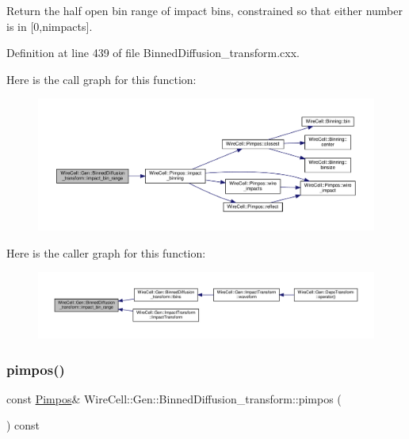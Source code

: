 Return the half open bin range of impact bins, constrained so that either number is in \mbox{[}0,nimpacts\mbox{]}. 

Definition at line 439 of file Binned\+Diffusion\+\_\+transform.\+cxx.

Here is the call graph for this function\+:
\nopagebreak
\begin{figure}[H]
\begin{center}
\leavevmode
\includegraphics[width=350pt]{class_wire_cell_1_1_gen_1_1_binned_diffusion__transform_acc55b5ad48ce4bc6081155bc9b3847aa_cgraph}
\end{center}
\end{figure}
Here is the caller graph for this function\+:
\nopagebreak
\begin{figure}[H]
\begin{center}
\leavevmode
\includegraphics[width=350pt]{class_wire_cell_1_1_gen_1_1_binned_diffusion__transform_acc55b5ad48ce4bc6081155bc9b3847aa_icgraph}
\end{center}
\end{figure}
\mbox{\label{class_wire_cell_1_1_gen_1_1_binned_diffusion__transform_a5da47771953721da39a78625d1845363}} 
\subsubsection{\texorpdfstring{pimpos()}{pimpos()}}
{\footnotesize\ttfamily const \hyperlink{class_wire_cell_1_1_pimpos}{Pimpos}\& Wire\+Cell\+::\+Gen\+::\+Binned\+Diffusion\+\_\+transform\+::pimpos (\begin{DoxyParamCaption}{ }\end{DoxyParamCaption}) const\hspace{0.3cm}{\ttfamily [inline]}}



